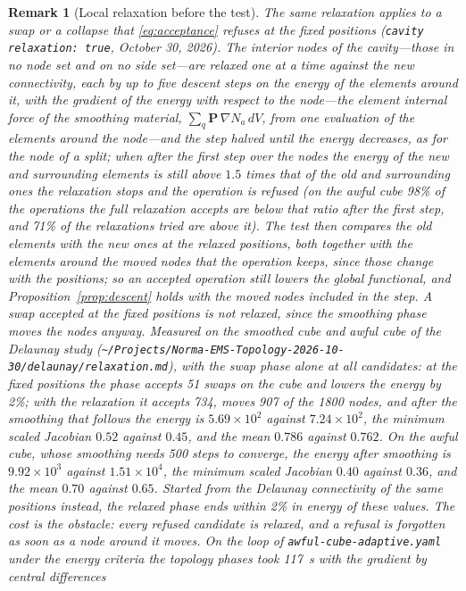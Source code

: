 \documentclass[11pt]{article}
\newcommand{\code}[1]{\texttt{#1}}
\newcommand{\bs}[1]{\boldsymbol{#1}}
\newtheorem{remark}{Remark}
\begin{document}
\begin{remark}[Local relaxation before the test]
The same relaxation applies to a swap or a collapse that
\eqref{eq:acceptance} refuses at the fixed positions
(\code{cavity relaxation: true}, October 30, 2026). The interior nodes
of the cavity---those in no node set and on no side set---are relaxed one
at a time against the new connectivity, each by up to five descent steps
on the energy of the elements around it, with the gradient of the energy
with respect to the node---the element internal force of the smoothing
material, $\sum_q \bs{P}\,\nabla N_a\,dV$, from one evaluation of the
elements around the node---and the step halved until the energy
decreases, as for the node of a split; when after the first step over
the nodes the energy of the new and surrounding elements is still above
$1.5$ times that of the old and surrounding ones the relaxation stops
and the operation is refused (on the awful cube 98\% of the operations
the full relaxation accepts are below that ratio after the first step,
and 71\% of the relaxations tried are above it). The test then compares the old elements with the new
ones at the relaxed positions, both together with the elements around
the moved nodes that the operation keeps, since those change with the
positions; so an accepted operation still lowers the global functional,
and Proposition~\ref{prop:descent} holds with the moved nodes included
in the step. A swap accepted at the fixed positions is not relaxed, since
the smoothing phase moves the nodes anyway. Measured on the smoothed
cube and awful cube of the Delaunay study
(\texttt{\textasciitilde/Projects/Norma-EMS-Topology-2026-10-30/delaunay/relaxation.md}),
with the swap phase alone at all candidates: at the fixed positions the
phase accepts 51 swaps on the cube and lowers the energy by 2\%; with
the relaxation it accepts 734, moves 907 of the 1800 nodes, and after
the smoothing that follows the energy is $5.69\times 10^{2}$ against
$7.24\times 10^{2}$, the minimum scaled Jacobian $0.52$ against $0.45$,
and the mean $0.786$ against $0.762$. On the awful cube, whose smoothing
needs 500 steps to converge, the energy after smoothing is
$9.92\times 10^{3}$ against $1.51\times 10^{4}$, the minimum scaled
Jacobian $0.40$ against $0.36$, and the mean $0.70$ against $0.65$. Started from the Delaunay connectivity of the same
positions instead, the relaxed phase ends within 2\% in energy of these
values. The cost is the obstacle: every refused candidate is relaxed,
and a refusal is forgotten as soon as a node around it moves. On the
loop of \code{awful-cube-adaptive.yaml} under the energy criteria the
topology phases took 117~s with the gradient by central differences

\end{remark}
\end{document}
